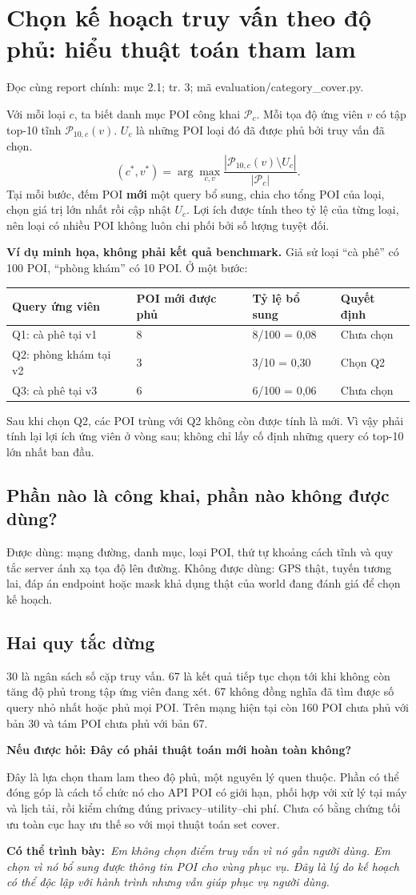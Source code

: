 \documentclass[10pt,a4paper]{article}
\newcommand{\say}[1]{\par\textbf{Có thể trình bày:}\ \textit{#1}\par}
\newcommand{\ask}[2]{\par\textbf{Nếu được hỏi: #1}\par #2\par}
\newcommand{\where}[1]{\par{\small\color{gray}Đọc cùng report chính: #1.}\par}
\newcommand{\example}{\textbf{Ví dụ minh họa, không phải kết quả benchmark.} }
\newcommand{\guidepage}[1]{\clearpage\section{#1}}
\begin{document}
\guidepage{Chọn kế hoạch truy vấn theo độ phủ: hiểu thuật toán tham lam}
\where{mục 2.1; tr. 3; mã evaluation/category\_cover.py}
Với mỗi loại $c$, ta biết danh mục POI công khai $\mathcal P_c$. Mỗi tọa độ ứng viên $v$ có tập top-10 tĩnh $\mathcal P_{10,c}(v)$. $U_c$ là những POI loại đó đã được phủ bởi truy vấn đã chọn.
\[
(c^*,v^*)=\arg\max_{c,v}\frac{|\mathcal P_{10,c}(v)\setminus U_c|}{|\mathcal P_c|}.
\]
Tại mỗi bước, đếm POI \textbf{mới} một query bổ sung, chia cho tổng POI của loại, chọn giá trị lớn nhất rồi cập nhật $U_c$. Lợi ích được tính theo tỷ lệ của từng loại, nên loại có nhiều POI không luôn chi phối bởi số lượng tuyệt đối.

\example Giả sử loại ``cà phê'' có 100 POI, ``phòng khám'' có 10 POI. Ở một bước:
\begin{longtable}{@{}P{4.4cm}P{4.2cm}P{3.7cm}P{3.8cm}@{}}
\toprule Query ứng viên & POI mới được phủ & Tỷ lệ bổ sung & Quyết định\\\midrule
Q1: cà phê tại v1 & 8 & 8/100 = 0,08 & Chưa chọn\\[3pt]
Q2: phòng khám tại v2 & 3 & 3/10 = 0,30 & Chọn Q2\\[3pt]
Q3: cà phê tại v3 & 6 & 6/100 = 0,06 & Chưa chọn\\
\bottomrule
\end{longtable}
Sau khi chọn Q2, các POI trùng với Q2 không còn được tính là mới. Vì vậy phải tính lại lợi ích ứng viên ở vòng sau; không chỉ lấy cố định những query có top-10 lớn nhất ban đầu.

\subsection*{Phần nào là công khai, phần nào không được dùng?}
Được dùng: mạng đường, danh mục, loại POI, thứ tự khoảng cách tĩnh và quy tắc server ánh xạ tọa độ lên đường. Không được dùng: GPS thật, tuyến tương lai, đáp án endpoint hoặc mask khả dụng thật của world đang đánh giá để chọn kế hoạch.

\subsection*{Hai quy tắc dừng}
30 là ngân sách số cặp truy vấn. 67 là kết quả tiếp tục chọn tới khi không còn tăng độ phủ trong tập ứng viên đang xét. 67 không đồng nghĩa đã tìm được số query nhỏ nhất hoặc phủ mọi POI. Trên mạng hiện tại còn 160 POI chưa phủ với bản 30 và tám POI chưa phủ với bản 67.

\ask{Đây có phải thuật toán mới hoàn toàn không?}{Đây là lựa chọn tham lam theo độ phủ, một nguyên lý quen thuộc. Phần có thể đóng góp là cách tổ chức nó cho API POI có giới hạn, phối hợp với xử lý tại máy và lịch tải, rồi kiểm chứng đúng privacy--utility--chi phí. Chưa có bằng chứng tối ưu toàn cục hay ưu thế so với mọi thuật toán set cover.}
\say{Em không chọn điểm truy vấn vì nó gần người dùng. Em chọn vì nó bổ sung được thông tin POI cho vùng phục vụ. Đây là lý do kế hoạch có thể độc lập với hành trình nhưng vẫn giúp phục vụ người dùng.}
\end{document}
